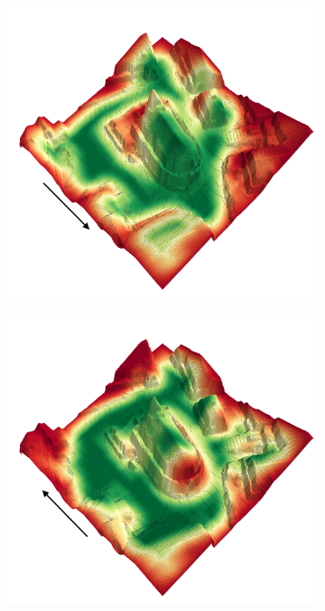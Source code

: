 \documentclass[../document.tex]{subfiles}
\begin{document}
\begin{figure} [htbp]
\begin{subfigure}[b]{0.45\textwidth}
    \end{subfigure}
    \begin{subfigure}[b]{0.45\textwidth}
      \includegraphics[width=\linewidth]{../img/4/traversability/sullens-church/-0.png}
    \end{subfigure}
    \begin{subfigure}[b]{0.45\textwidth}
        \includegraphics[width=\linewidth]{../img/4/traversability/sullens-church/-180.png}  

\end{subfigure}
\end{figure}
\end{document}
